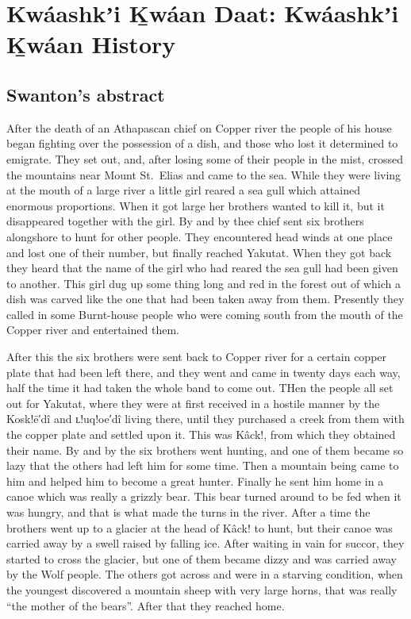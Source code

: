 
\resetexcnt
\chapter{Kwáashkʼi Ḵwáan Daat: Kwáashkʼi Ḵwáan History}\label{ch:105-kwaashkikhwaan-history}

\section{Swanton’s abstract}\label{sec:104-swanton-abstract}

After the death of an Athapascan chief on Copper river the people of his house began fighting over the possession of a dish, and those who lost it determined to emigrate.
They set out, and, after losing some of their people in the mist, crossed the mountains near Mount St.\ Elias and came to the sea.
While they were living at the mouth of a large river a little girl reared a sea gull which attained enormous proportions.
When it got large her brothers wanted to kill it, but it disappeared together with the girl.
By and by thee chief sent six brothers alongshore to hunt for other people.
They encountered head winds at one place and lost one of their number, but finally reached Yakutat.
When they got back they heard that the name of the girl who had reared the sea gull had been given to another.
This girl dug up some thing long and red in the forest out of which a dish was carved like the one that had been taken away from them.
Presently they called in some Burnt-house people who were coming south from the mouth of the Copper river and entertained them.

After this the six brothers were sent back to Copper river for a certain copper plate that had been left there, and they went and came in twenty days each way, half the time it had taken the whole band to come out.
THen the people all set out for Yakutat, where they were at first received in a hostile manner by the Kosk!ē′dî and ʟ!uq!oe′dî living there, until they purchased a creek from them with the copper plate and settled upon it.
This was Kâck!, from which they obtained their name.
By and by the six brothers went hunting, and one of them became so lazy that the others had left him for some time.
Then a mountain being came to him and helped him to become a great hunter.
Finally he sent him home in a canoe which was really a grizzly bear.
This bear turned around to be fed when it was hungry, and that is what made the turns in the river.
After a time the brothers went up to a glacier at the head of Kâck! to hunt, but their canoe was carried away by a swell raised by falling ice.
After waiting in vain for succor, they started to cross the glacier, but one of them became dizzy and was carried away by the Wolf people.
The others got across and were in a starving condition, when the youngest discovered a mountain sheep with very large horns, that was really “the mother of the bears”.
After that they reached home.

